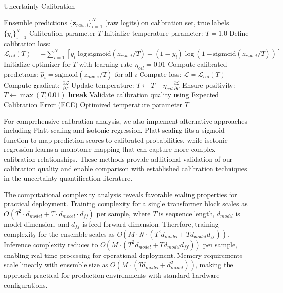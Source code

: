 \documentclass[journal]{IEEEtran}
\begin{document}
\begin{algorithm}[t]
\caption{Uncertainty Calibration}
\label{alg:calibration}
\begin{algorithmic}[1]
\REQUIRE Ensemble predictions $\{\mathbf{z}_{raw,i}\}_{i=1}^N$ (raw logits) on calibration set, true labels $\{y_i\}_{i=1}^N$
\ENSURE Calibration parameter $T$
\STATE Initialize temperature parameter: $T = 1.0$
\STATE Define calibration loss: $\mathcal{L}_{cal}(T) = -\sum_{i=1}^N [y_i \log \text{sigmoid}(\bar{z}_{raw,i}/T) + (1-y_i) \log(1-\text{sigmoid}(\bar{z}_{raw,i}/T))]$ 
\STATE Initialize optimizer for $T$ with learning rate $\eta_{cal} = 0.01$
    \STATE Compute calibrated predictions: $\hat{p}_i = \text{sigmoid}(\bar{z}_{raw,i} / T)$ for all $i$
    \STATE Compute loss: $\mathcal{L} = \mathcal{L}_{cal}(T)$
    \STATE Compute gradient: $\frac{\partial \mathcal{L}}{\partial T}$
    \STATE Update temperature: $T \leftarrow T - \eta_{cal} \frac{\partial \mathcal{L}}{\partial T}$
    \STATE Ensure positivity: $T \leftarrow \max(T, 0.01)$
        \STATE \textbf{break}
    \ENDIF
\ENDFOR
\STATE Validate calibration quality using Expected Calibration Error (ECE)
\RETURN Optimized temperature parameter $T$
\end{algorithmic}
\end{algorithm}

For comprehensive calibration analysis, we also implement alternative approaches including Platt scaling and isotonic regression. Platt scaling fits a sigmoid function to map prediction scores to calibrated probabilities, while isotonic regression learns a monotonic mapping that can capture more complex calibration relationships. These methods provide additional validation of our calibration quality and enable comparison with established calibration techniques in the uncertainty quantification literature.

The computational complexity analysis reveals favorable scaling properties for practical deployment. Training complexity for a single transformer block scales as $O(T^2 \cdot d_{model} + T \cdot d_{model} \cdot d_{ff})$ per sample, where $T$ is sequence length, $d_{model}$ is model dimension, and $d_{ff}$ is feed-forward dimension. Therefore, training complexity for the ensemble scales as $O(M \cdot N \cdot (T^2 d_{model} + T d_{model} d_{ff}))$. Inference complexity reduces to $O(M \cdot (T^2 d_{model} + T d_{model} d_{ff}))$ per sample, enabling real-time processing for operational deployment. Memory requirements scale linearly with ensemble size as $O(M \cdot (T d_{model} + d_{model}^2))$, making the approach practical for production environments with standard hardware configurations.
\end{document}
